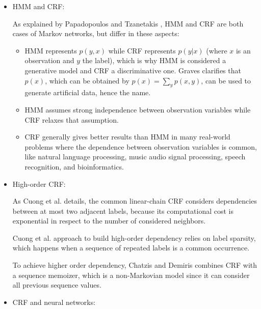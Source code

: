 \begin{enumerate}
\begin{itemize}
    \item HMM and CRF: 
    
    As explained by Papadopoulos and Tzanetakis \cite{7579173}, HMM and CRF are both cases of Markov networks, but differ in these aspects:
    \begin{itemize}
        \item HMM represents $p(y,x)$ while CRF represents $p(y|x)$ (where $x$ is an observation and $y$ the label), which is why HMM is considered a generative model and CRF a discriminative one.
        Graves \cite{gravessupervised} clarifies that $p(x)$, which can be obtained by $p(x) = \sum_{y} p(x,y)$, can be used to generate artificial data, hence the name.
        \item HMM assumes strong independence between observation variables while CRF relaxes that assumption.
        \item CRF generally gives better results than HMM in many real-world problems where the dependence between observation variables is common, like natural language processing, music audio signal processing, speech recognition, and bioinformatics.
        
    \end{itemize}
    
    \item High-order CRF:
    
    As Cuong et al. \cite{Cuong:2014:CRF:2627435.2638567} details, the common linear-chain CRF considers dependencies between at most two adjacent labels, because its computational cost is exponential in respect to the number of considered neighbors.
    
    Cuong et al. \cite{Cuong:2014:CRF:2627435.2638567} approach to build high-order dependency relies on label sparsity, which happens when a sequence of repeated labels is a common occurrence.
    
    To achieve higher order dependency, Chatzis and Demiris \cite{Chatzis20131523} combines CRF with a sequence memoizer, which is a non-Markovian model since it can consider all previous sequence values.
    
    
    
    \item CRF and neural networks:
    

\end{itemize}
\end{enumerate}
